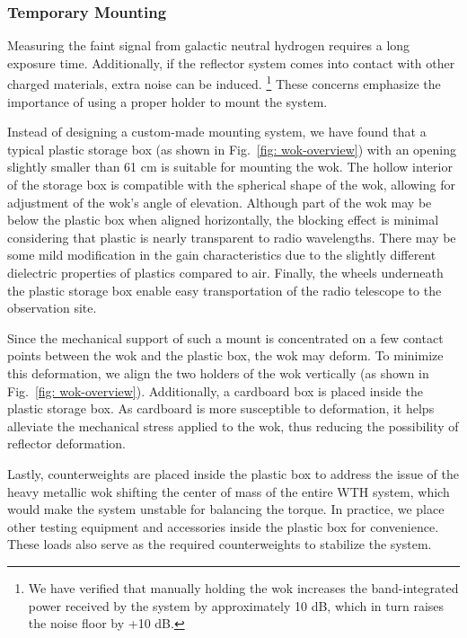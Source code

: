 \documentclass[12pt]{article}
\begin{document}
    \subsubsection{Temporary Mounting}
    Measuring the faint signal from galactic neutral hydrogen requires a long exposure time. Additionally, if the reflector system comes into contact with other charged materials, extra noise can be induced.%
    \footnote{We have verified that manually holding the wok increases the band-integrated power received by the system by approximately 10 dB, which in turn raises the noise floor by +10 dB.}
    These concerns emphasize the importance of using a proper holder to mount the system.

    Instead of designing a custom-made mounting system, we have found that a typical plastic storage box (as shown in Fig.~\ref{fig: wok-overview}) with an opening slightly smaller than 61 cm is suitable for mounting the wok. 
    The hollow interior of the storage box is compatible with the spherical shape of the wok, allowing for adjustment of the wok's angle of elevation. Although part of the wok may be below the plastic box when aligned horizontally, the blocking effect is minimal considering that plastic is nearly transparent to radio wavelengths. There may be some mild modification in the gain characteristics due to the slightly different dielectric properties of plastics compared to air. 
    Finally, the wheels underneath the plastic storage box enable easy transportation of the radio telescope to the observation site.
    
    Since the mechanical support of such a mount is concentrated on a few contact points between the wok and the plastic box, the wok may deform. To minimize this deformation, we align the two holders of the wok vertically (as shown in Fig.~\ref{fig: wok-overview}). 
    Additionally, a cardboard box is placed inside the plastic storage box. As cardboard is more susceptible to deformation, it helps alleviate the mechanical stress applied to the wok, thus reducing the possibility of reflector deformation.
    
    Lastly, counterweights are placed inside the plastic box to address the issue of the heavy metallic wok shifting the center of mass of the entire WTH system, which would make the system unstable for balancing the torque. 
    In practice, we place other testing equipment and accessories inside the plastic box for convenience. These loads also serve as the required counterweights to stabilize the system.
\end{document}
